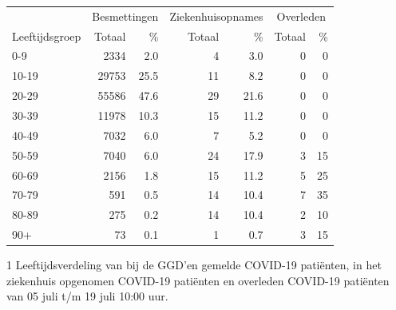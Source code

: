 \documentclass[
  english,
  man,floatsintext]{apa6}
\begin{document}
\begin{table}
\centering\begingroup\fontsize{11}{13}\selectfont

\begin{threeparttable}
\begin{tabular}{lrrrrrr}
\toprule
\multicolumn{1}{c}{ } & \multicolumn{2}{c}{Besmettingen} & \multicolumn{2}{c}{Ziekenhuisopnames} & \multicolumn{2}{c}{Overleden} \\
\cmidrule(l{3pt}r{3pt}){2-3} \cmidrule(l{3pt}r{3pt}){4-5} \cmidrule(l{3pt}r{3pt}){6-7}
Leeftijdsgroep & Totaal & \% & Totaal & \% & Totaal & \%\\
\midrule
0-9 & 2334 & 2.0 & 4 & 3.0 & 0 & 0\\
10-19 & 29753 & 25.5 & 11 & 8.2 & 0 & 0\\
20-29 & 55586 & 47.6 & 29 & 21.6 & 0 & 0\\
30-39 & 11978 & 10.3 & 15 & 11.2 & 0 & 0\\
40-49 & 7032 & 6.0 & 7 & 5.2 & 0 & 0\\
50-59 & 7040 & 6.0 & 24 & 17.9 & 3 & 15\\
60-69 & 2156 & 1.8 & 15 & 11.2 & 5 & 25\\
70-79 & 591 & 0.5 & 14 & 10.4 & 7 & 35\\
80-89 & 275 & 0.2 & 14 & 10.4 & 2 & 10\\
90+ & 73 & 0.1 & 1 & 0.7 & 3 & 15\\
\bottomrule
\end{tabular}
\begin{tablenotes}
\item[1] Leeftijdsverdeling van bij de GGD’en gemelde COVID-19 patiënten, in het ziekenhuis opgenomen COVID-19 patiënten en overleden COVID-19 patiënten van 05 juli t/m 19 juli 10:00 uur.
\end{tablenotes}
\end{threeparttable}
\endgroup{}
\end{table}

\newpage
\end{document}
